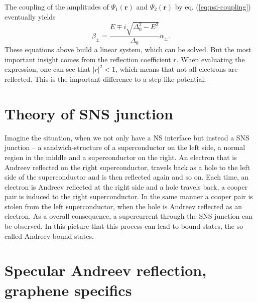 The coupling of the amplitudes of $\Psi_1 \left( \mathbf{r} \right)$ and $\Psi_2 \left( \mathbf{r} \right)$ by eq. (\ref{eq:psi-coupling}) eventually yields
\begin{equation}
\beta_\pm = \frac{E \mp i \sqrt{\Delta_0^2 - E^2}}{\Delta_0}\alpha_\pm.
\end{equation}
These equations above build a linear system, which can be solved. But the most important insight comes from the reflection coefficient $r$. When evaluating the expression, one can see that $|r|^2 < 1$, which means that not all electrons are reflected. This is the important difference to a step-like potential.

\section{Theory of SNS junction}

Imagine the situation, when we not only have a NS interface but instead a SNS junction – a sandwich-structure of a superconductor on the left side, a normal region in the middle and a superconductor on the right. An electron that is Andreev reflected on the right superconductor, travels back as a hole to the left side of the superconductor and is then reflected again and so on. Each time, an electron is Andreev reflected at the right side and a hole travels back, a cooper pair is induced to the right superconductor. In the same manner a cooper pair is stolen from the left superconductor, when the hole is Andreev reflected as an electron. As a overall consequence, a supercurrent through the SNS junction can be observed. 
In this picture that this process can lead to bound states, the so called Andreev bound states. 



\section{Specular Andreev reflection, graphene specifics}

